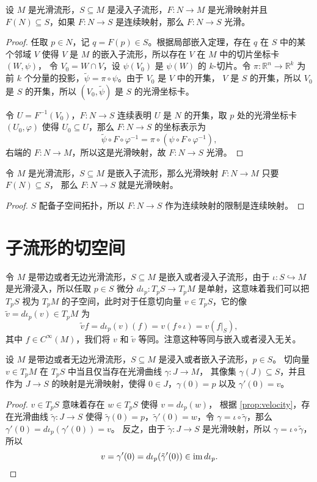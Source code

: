 \documentclass[fontset=none]{Notes}
\DeclareMathOperator\im{im}
\begin{document}
\begin{theorem}[光滑映射限制值域]
  设 $M$ 是光滑流形，$S\subseteq M$ 是浸入子流形，$F:N\to M$
  是光滑映射并且 $F(N)\subseteq S$，如果 $F:N\to S$ 是连续映射，那么
  $F:N\to S$ 光滑。
\end{theorem}
\begin{proof}
  任取 $p\in N$，记 $q=F(p)\in S$。根据局部嵌入定理，存在 $q$ 在 $S$ 中的某个邻域 $V$
  使得 $V$ 是 $M$ 的嵌入子流形，所以存在 $V$ 在 $M$ 中的切片坐标卡 $(W,\psi)$，
  令 $V_0=W\cap V$，设 $\psi(V_0)$ 是 $\psi(W)$ 的 $k$-切片。令 $\pi:\mathbb{R}^n\to \mathbb{R}^k$
  为前 $k$ 个分量的投影，$\tilde{\psi}=\pi\circ\psi$。由于 $V_0$ 是 $V$ 中的开集，
  $V$ 是 $S$ 的开集，所以 $V_0$ 是 $S$ 的开集，所以 $(V_0,\tilde\psi)$ 是 $S$ 的光滑坐标卡。

  令 $U=F^{-1}(V_0)$，$F:N\to S$ 连续表明 $U$ 是 $N$ 的开集，取 $p$ 处的光滑坐标卡 $(U_0,\varphi)$
  使得 $U_0\subseteq U$，那么 $F:N\to S$ 的坐标表示为
  \[
    \tilde{\psi}\circ F\circ \varphi^{-1}=\pi\circ(\psi\circ F\circ\varphi^{-1}),
  \] 
  右端的 $F:N\to M$，所以这是光滑映射，故 $F:N\to S$ 光滑。
\end{proof}

\begin{corollary}
  令 $M$ 是光滑流形，$S\subseteq M$ 是嵌入子流形，那么光滑映射 $F:N\to M$ 只要 $F(N)\subseteq S$，
  那么 $F:N\to S$ 就是光滑映射。
\end{corollary}
\begin{proof}
  $S$ 配备子空间拓扑，所以 $F:N\to S$ 作为连续映射的限制是连续映射。
\end{proof}

\section{子流形的切空间}

令 $M$ 是带边或者无边光滑流形，$S\subseteq M$ 是嵌入或者浸入子流形，由于 $\iota:S\hookrightarrow M$
是光滑浸入，所以任取 $p\in S$ 微分 $d\iota_p:T_pS\to T_pM$ 是单射，这意味着我们可以把 $T_pS$ 视为
$T_pM$ 的子空间，此时对于任意切向量 $v\in T_pS$，它的像 $\tilde v=d\iota_p(v)\in T_pM$ 为
\[
  \tilde{v}f=d\iota_p(v)(f)=v(f\circ\iota)=v(f|_S),
\]
其中 $f\in C^\infty(M)$，我们将 $v$ 和 $\tilde v$ 等同。注意这种等同与嵌入或者浸入无关。

\begin{proposition}
  设 $M$ 是带边或者无边光滑流形，$S\subseteq M$ 是浸入或者嵌入子流形，$p\in S$。
  切向量 $v\in T_pM$ 在 $T_pS$ 中当且仅当存在光滑曲线 $\gamma:J\to M$，
  其像集 $\gamma(J)\subseteq S$，并且作为 $J\to S$ 的映射是光滑映射，使得
  $0\in J$，$\gamma(0)=p$ 以及 $\gamma'(0)=v$。
\end{proposition}
\begin{proof}
  $v\in T_pS$ 意味着存在 $w\in T_pS$ 使得 $v=d\iota_p(w)$，
  根据 \autoref{prop:velocity}，存在光滑曲线 $\tilde\gamma:J\to S$
  使得 $\tilde\gamma(0)=p$，$\tilde\gamma'(0)=w$，令
  $\gamma=\iota\circ\tilde{\gamma}$，那么 $\gamma'(0)=d\iota_p(\gamma'(0))=v$。
  反之，由于 $\tilde{\gamma}:J\to S$ 是光滑映射，所以
  $\gamma=\iota\circ\tilde{\gamma}$，所以
  \[
    v=\gamma'(0)=d\iota_p(\tilde \gamma'(0))  \in \im d\iota_p.\qedhere
  \]
\end{proof}
\end{document}
